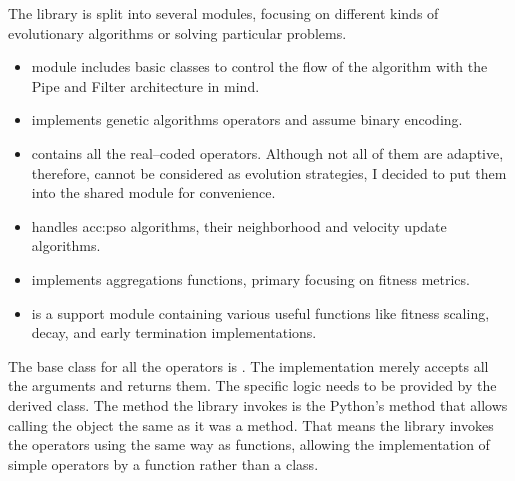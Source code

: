 The library is split into several modules, focusing on different kinds of evolutionary algorithms or solving particular problems.
\begin{itemize}
    \item {} module includes basic classes to control the flow of the algorithm with the Pipe and Filter architecture in mind.
    \item {} implements genetic algorithms operators and assume binary encoding.
    \item {} contains all the real--coded operators. Although not all of them are adaptive, therefore, cannot be considered as evolution strategies, I decided to put them into the shared module for convenience.
    \item {} handles \acrlong{acc:pso} algorithms, their neighborhood and velocity update algorithms.
    \item {} implements aggregations functions, primary focusing on fitness metrics.
    \item {} is a support module containing various useful functions like fitness scaling, decay, and early termination implementations.
\end{itemize}

The base class for all the operators is . The implementation merely accepts all the arguments and returns them. The specific logic needs to be provided by the derived class. The method the library invokes is the Python's  method that allows calling the object the same as it was a method. That means the library invokes the operators using the same way as functions, allowing the implementation of simple operators by a function rather than a class.

